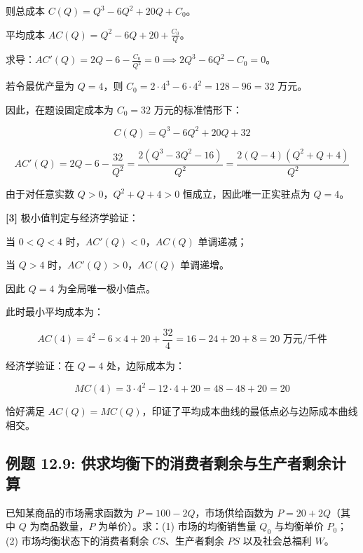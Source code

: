 \documentclass[11pt,a4paper,UTF8]{ctexart}
\begin{document}
\begin{solbox}[分步推导与答题规范]
则总成本 $C(Q) = Q^3 - 6Q^2 + 20Q + C_0$。

平均成本 $AC(Q) = Q^2 - 6Q + 20 + \frac{C_0}{Q}$。

求导：$AC'(Q) = 2Q - 6 - \frac{C_0}{Q^2} = 0 \implies 2Q^3 - 6Q^2 - C_0 = 0$。

若令最优产量为 $Q = 4$，则 $C_0 = 2 \cdot 4^3 - 6 \cdot 4^2 = 128 - 96 = 32$ 万元。

因此，在题设固定成本为 $C_0 = 32$ 万元的标准情形下：


\begin{equation*}
C(Q) = Q^3 - 6Q^2 + 20Q + 32
\end{equation*}



\begin{equation*}
AC'(Q) = 2Q - 6 - \frac{32}{Q^2} = \frac{2(Q^3 - 3Q^2 - 16)}{Q^2} = \frac{2(Q - 4)(Q^2 + Q + 4)}{Q^2}
\end{equation*}


由于对任意实数 $Q > 0$，$Q^2 + Q + 4 > 0$ 恒成立，因此唯一正实驻点为 $Q = 4$。

\textbf{[3]} 极小值判定与经济学验证：

当 $0 < Q < 4$ 时，$AC'(Q) < 0$，$AC(Q)$ 单调递减；

当 $Q > 4$ 时，$AC'(Q) > 0$，$AC(Q)$ 单调递增。

因此 $Q = 4$ 为全局唯一极小值点。

此时最小平均成本为：


\begin{equation*}
AC(4) = 4^2 - 6 \times 4 + 20 + \frac{32}{4} = 16 - 24 + 20 + 8 = 20\text{ 万元/千件}
\end{equation*}


经济学验证：在 $Q = 4$ 处，边际成本为：


\begin{equation*}
MC(4) = 3 \cdot 4^2 - 12 \cdot 4 + 20 = 48 - 48 + 20 = 20
\end{equation*}


恰好满足 $AC(Q) = MC(Q)$，印证了平均成本曲线的最低点必与边际成本曲线相交。
\end{solbox}


\subsection{例题 12.9: 供求均衡下的消费者剩余与生产者剩余计算}

已知某商品的市场需求函数为 $P = 100 - 2Q$，市场供给函数为 $P = 20 + 2Q$（其中 $Q$ 为商品数量，$P$ 为单价）。求：(1) 市场的均衡销售量 $Q_0$ 与均衡单价 $P_0$；(2) 市场均衡状态下的消费者剩余 $CS$、生产者剩余 $PS$ 以及社会总福利 $W$。
\end{document}
